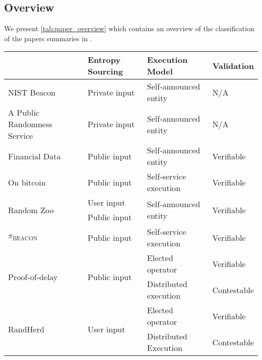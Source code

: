 \subsection{Overview}\label{sub:overview}
We present \cref{tab:paper_overview} which contains an overview of the classification of the papers summaries in .

\begin{table}[htbp]
    \centering
    \begin{tabularx}{\textwidth}{Xlll}
                                 & \textbf{Entropy Sourcing}     & \textbf{Execution Model}               & \textbf{Validation}         \\\midrule
NIST Beacon                      & Private input                 & Self-announced entity                  & N/A                         \\ [1.5em]
A Public Randomness Service      & Private input                 & Self-announced entity                  & N/A                         \\ [1.5em]
Financial Data                   & Public  input                 & Self-announced entity                  & Verifiable                  \\ [1.5em]
On bitcoin                       & Public input                  & Self-service execution                 & Verifiable                  \\ [1.5em]
\multirow{2}{*}{Random Zoo}      & User input                    & \multirow{2}{*}{Self-announced entity} & \multirow{2}{*}{Verifiable} \\
                                 & Public input                  &                                        & \\ [1.5em]
$\pi_\text{BEACON}$              & Public input                  & Self-service execution                 & Verifiable                  \\ [1.5em]
\multirow{2}{*}{Proof-of-delay}  & \multirow{2}{*}{Public input} & Elected operator                       & Verifiable                  \\
                                 &                               & Distributed execution                  & Contestable                 \\ [1.5em]
\multirow{2}{*}{RandHerd}        & \multirow{2}{*}{User input}   & Elected operator                       & Verifiable                  \\
                                 &                               & Distributed Execution                  & Contestable                 \\ [1.5em]

\end{tabularx}
\end{table}
